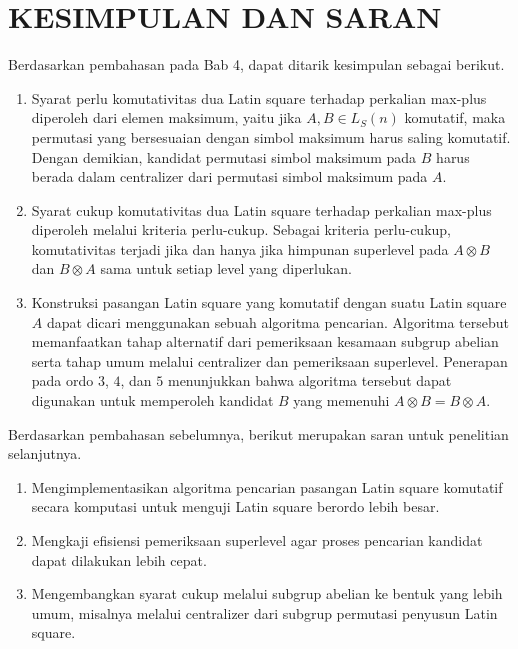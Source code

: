 \chapter{KESIMPULAN DAN SARAN}

Berdasarkan pembahasan pada Bab 4, dapat ditarik kesimpulan sebagai berikut.

\begin{enumerate}
      \item Syarat perlu komutativitas dua Latin square terhadap perkalian max-plus
            diperoleh dari elemen maksimum, yaitu jika $A,B\in L_S(n)$
            komutatif, maka permutasi yang bersesuaian dengan simbol maksimum
            harus saling komutatif. Dengan demikian, kandidat permutasi simbol
            maksimum pada $B$ harus berada dalam centralizer dari permutasi simbol
            maksimum pada $A$.

      \item Syarat cukup komutativitas dua Latin square terhadap perkalian max-plus
            diperoleh melalui kriteria perlu-cukup. Sebagai kriteria perlu-cukup, komutativitas terjadi jika dan hanya jika himpunan superlevel pada $A\otimes B$ dan $B\otimes A$ sama untuk setiap level yang diperlukan.

      \item Konstruksi pasangan Latin square yang komutatif dengan suatu Latin
            square $A$ dapat dicari menggunakan sebuah algoritma pencarian. Algoritma
            tersebut memanfaatkan tahap alternatif dari
            pemeriksaan kesamaan subgrup abelian serta tahap umum melalui
            centralizer dan pemeriksaan superlevel. Penerapan pada ordo $3$, $4$,
            dan $5$ menunjukkan bahwa algoritma tersebut dapat digunakan untuk
            memperoleh kandidat $B$ yang memenuhi $A\otimes B=B\otimes A$.
\end{enumerate}

Berdasarkan pembahasan sebelumnya, berikut merupakan saran untuk penelitian
selanjutnya.

\begin{enumerate}
      \item Mengimplementasikan
            algoritma pencarian pasangan Latin square komutatif secara
            komputasi untuk menguji Latin square berordo lebih besar.

      \item Mengkaji efisiensi pemeriksaan superlevel agar proses pencarian
            kandidat dapat dilakukan lebih cepat.

      \item Mengembangkan syarat cukup melalui subgrup abelian ke bentuk yang
            lebih umum, misalnya melalui centralizer dari subgrup permutasi
            penyusun Latin square.
\end{enumerate}